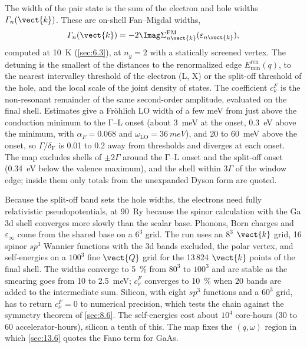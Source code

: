 The width of the pair state is the sum of the electron and hole widths $\varGamma_n(\vect{k})$. These are on-shell Fan--Migdal widths,
\begin{equation*}
  \varGamma_n(\vect{k}) = -2\Imag\Sigma^{\mathrm{FM}}_{n\vect{k}}(\varepsilon_{n\vect{k}}) ,
\end{equation*}
computed at \SI{10}{K} (\cref{sec:6.3}), at $n_g = 2$ with a statically screened vertex. The detuning is the smallest of the distances to the renormalized edge $E_{\min}^{\mathrm{ren}}(q)$, to the nearest intervalley threshold of the electron (L, X) or the split-off threshold of the hole, and the local scale of the joint density of states. The coefficient $c^F_\nu$ is the non-resonant remainder of the same second-order amplitude, evaluated on the final shell. Estimates give a Fr\"ohlich LO width of a few meV from just above the conduction minimum to the $\mathrm{\Gamma}$--L onset (about \SI{3}{meV} at the onset, \SI{0.3}{eV} above the minimum, with $\alpha_F = 0.068$ and $\omega_{\mathrm{LO}} = \SI{36}{meV}$), and 20 to \SI{60}{meV} above the onset, so $\varGamma/\delta_{\mathrm{F}}$ is 0.01 to 0.2 away from thresholds and diverges at each onset. The map excludes shells of $\pm2\varGamma$ around the $\mathrm{\Gamma}$--L onset and the split-off onset (\SI{0.34}{eV} below the valence maximum), and the shell within $3\varGamma$ of the window edge; inside them only totals from the unexpanded Dyson form are quoted.

Because the split-off band sets the hole widths, the electrons need fully relativistic pseudopotentials, at \SI{90}{Ry} because the spinor calculation with the Ga 3d shell converges more slowly than the scalar base. Phonons, Born charges and $\varepsilon_\infty$ come from the shared base on a $6^3$ grid. The run uses an $8^3$ $\vect{k}$ grid, 16 spinor $sp^3$ Wannier functions with the 3d bands excluded, the polar vertex, and self-energies on a $100^3$ fine $\vect{Q}$ grid for the 13\,824 $\vect{k}$ points of the final shell. The widths converge to \SI{5}{\percent} from $80^3$ to $100^3$ and are stable as the smearing goes from 10 to \SI{2.5}{meV}; $c^F_\nu$ converges to \SI{10}{\percent} when 20 bands are added to the intermediate sum. Silicon, with eight $sp^3$ functions and a $60^3$ grid, has to return $c^F_\nu = 0$ to numerical precision, which tests the chain against the symmetry theorem of \cref{sec:8.6}. The self-energies cost about $10^4$ core-hours (30 to 60 accelerator-hours), silicon a tenth of this. The map fixes the $(q,\omega)$ region in which \cref{sec:13.6} quotes the Fano term for GaAs.

